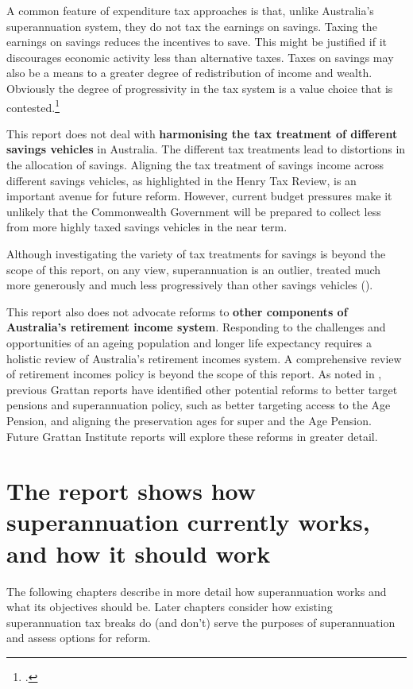 A common feature of expenditure tax approaches is that, unlike Australia’s superannuation system, they do not tax the earnings on savings. Taxing the earnings on savings reduces the incentives to save. This might be justified if it discourages economic activity less than alternative taxes. Taxes on savings may also be a means to a greater degree of redistribution of income and wealth. Obviously the degree of progressivity in the tax system is a value choice that is contested.\footcite{Davidson2015} 

This report does not deal with \textbf{harmonising the tax treatment of different savings vehicles} in Australia. The different tax treatments lead to distortions in the allocation of savings.  Aligning the tax treatment of savings income across different savings vehicles, as highlighted in the Henry Tax Review, is an important avenue for future reform. However, current budget pressures make it unlikely that the Commonwealth Government will be prepared to collect less from more highly taxed savings vehicles in the near term.

Although investigating the variety of tax treatments for savings is beyond the scope of this report, on any view, superannuation is an outlier, treated much more generously and much less progressively than other savings vehicles ().

This report also does not advocate reforms to \textbf{other components of Australia’s retirement income system}. Responding to the challenges and opportunities of an ageing population and longer life expectancy requires a holistic review of Australia’s retirement incomes system. A comprehensive review of retirement incomes policy is beyond the scope of this report. As noted in , previous Grattan reports have identified other potential reforms to better target pensions and superannuation policy, such as better targeting access to the Age Pension, and aligning the preservation ages for super and the Age Pension. Future Grattan Institute reports will explore these reforms in greater detail. 

\section{The report shows how superannuation currently works, and how it should work}
The following chapters describe in more detail how superannuation works and what its objectives should be. Later chapters consider how existing superannuation tax breaks do (and don’t) serve the purposes of superannuation and assess options for reform.

